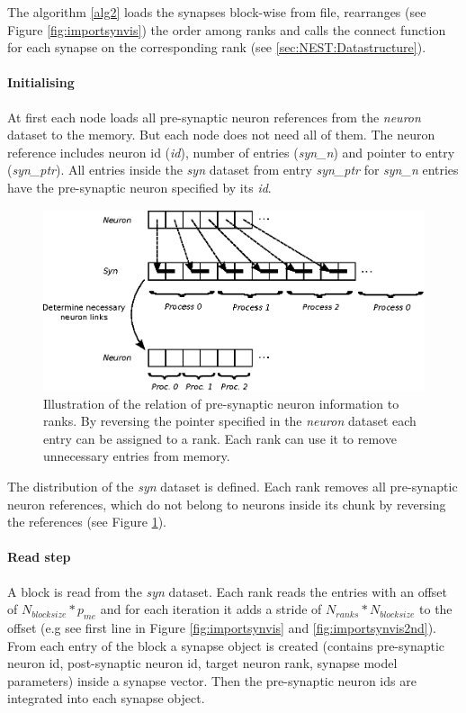 The algorithm \ref{alg2} loads the synapses block-wise from file, rearranges (see Figure \ref{fig:importsynvis}) the order
among ranks and calls the connect function for each synapse on the corresponding rank (see \ref{sec:NEST:Datastructure}).

\newpage
\paragraph{Initialising}
At first each node loads all pre-synaptic neuron references from the \emph{neuron} dataset to the memory.
But each node does not need all of them. 
The neuron reference includes neuron id (\emph{id}), number of entries  (\emph{syn\_n}) and pointer to entry (\emph{syn\_ptr}).
All entries inside the \emph{syn} dataset from  entry \emph{syn\_ptr} for \emph{syn\_n} entries have the pre-synaptic neuron specified by its \emph{id}.
\begin{figure}[ht!]
\centering
\includegraphics[scale=1.0]{pictures/NeuronLinksRemoving.eps}
\caption{Illustration of the relation of pre-synaptic neuron information to ranks.
By reversing the pointer specified in the \emph{neuron} dataset
each entry can be assigned to a rank.
Each rank can use it to remove unnecessary entries from memory.
}
\label{fig:neuonlinksremoving}
\end{figure}
The distribution of the \emph{syn} dataset is defined.
Each rank removes all pre-synaptic neuron references, which do not belong to
neurons inside its chunk by reversing the references (see Figure \ref{fig:neuonlinksremoving}).

\paragraph{Read step}
A block is read from the \emph{syn} dataset.
Each rank reads the entries with an offset of $N_{blocksize} * p_{me}$ and
for each iteration it adds a stride of $N_{ranks} * N_{blocksize}$  to the offset (e.g see first line in Figure \ref{fig:importsynvis} and \ref{fig:importsynvis2nd}).
From each entry of the block a synapse object is created
(contains pre-synaptic neuron id, post-synaptic neuron id, target neuron rank, synapse model parameters)
inside a synapse vector. Then the pre-synaptic neuron ids are integrated into each synapse object.

